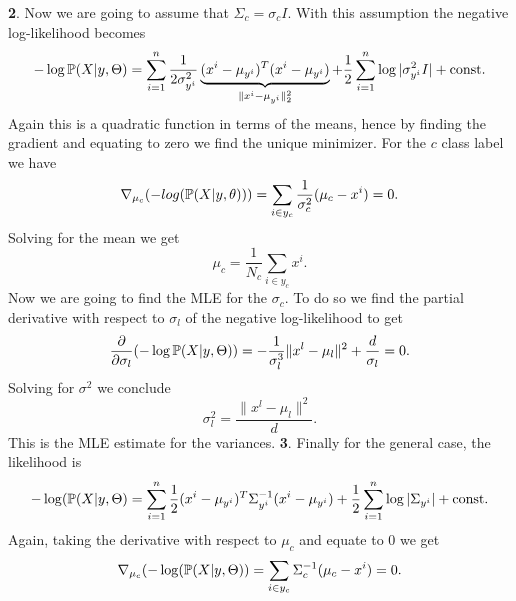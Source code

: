 \documentclass{article}
\begin{document}
\textbf{2}. 
\newline
Now we are going to assume that $\Sigma_{c}=\sigma_{c}I$. With this assumption the negative log-likelihood becomes
\begin{equation*}
- \log \mathbb{P}(X|y,\Theta)
 = \sum_{i=1}^n \frac{1}{2\sigma_{y^{i}}^{2}}\underbrace{(x^i - \mu_{y^i})^T(x^i - \mu_{y^i})}_{\|x^{i}-\mu_{y^{i}}\|^{2}_{2}} + \frac 1 2\sum_{i=1}^n \log|\sigma_{y^{i}}^{2}I| + \text{const.}
\end{equation*}
Again this is a quadratic function in terms of the means, hence by finding the gradient and equating to zero we find the unique minimizer. For the $c$ class label we have
\begin{equation*}
\nabla_{\mu_{c}}(-log(\mathbb{P}(X|y,\theta)))=\sum_{i\in y_{c}}\frac{1}{\sigma_{c}^{2}}(\mu_{c}-x^{i})=0.
\end{equation*}
Solving for the mean we get
\begin{equation}\label{eqnmus}
\mu_{c}=\frac{1}{N_{c}}\sum_{i\in y_{c}}x^{i}.
\end{equation}
Now we are going to find the MLE for the $\sigma_{c}$. To do so we find the partial derivative with respect to $\sigma_{l}$ of the negative log-likelihood to get
\begin{equation*}
\frac{\partial }{\partial\sigma_{l}}(- \log \mathbb{P}(X|y,\Theta))=-\frac{1}{\sigma_{l}^{3}}\|x^{l}-\mu_{l}\|^{2}+\frac{d}{\sigma_{l}}=0.
\end{equation*}
Solving for $\sigma^{2}$ we conclude
\begin{equation}\label{eqnsigmas}
\sigma_{l}^{2}=\frac{\|x^{l}-\mu_{l}\|^{2}}{d}.
\end{equation}
This is the MLE estimate for the variances.
\newpage
\textbf{3}. 
\newline
Finally for the general case, the likelihood is 
\begin{equation*}
-\log(\mathbb{P}(X|y,\Theta) = \sum_{i=1}^n \frac{1}{2}(x^i - \mu_{y^i})^T\Sigma_{y^i}^{-1}(x^i - \mu_{y^i}) + \frac 1 2\sum_{i=1}^n \log|\Sigma_{y^i}| + \text{const.}
\end{equation*}
Again, taking the derivative with respect to $\mu_{c}$ and equate to $0$  we get
\begin{equation*}
\nabla_{\mu_{c}}(-\log(\mathbb{P}(X|y,\Theta))=\sum_{i\in y_{c}}\Sigma_{c}^{-1}(\mu_{c}-x^{i})=0.
\end{equation*}
\end{document}
